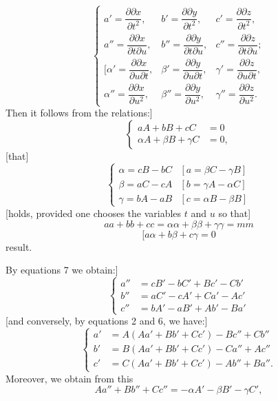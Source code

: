 %
\begin{equation}\tag*{[5]}
\left\{\begin{array}{lll}
a'=\dfrac{\partial\partial x}{\partial t^2},&b'=\dfrac{\partial\partial y}{\partial t^2},&c'=\dfrac{\partial\partial z}{\partial t^2},\\[6pt]
a''=\dfrac{\partial\partial x}{\partial t\partial u},&b''=\dfrac{\partial\partial y}{\partial t\partial u},&c''=\dfrac{\partial\partial z}{\partial t\partial u};\\[6pt]
[\alpha'=\dfrac{\partial\partial x}{\partial u\partial t},&\beta'=\dfrac{\partial\partial y}{\partial u\partial t},&\gamma'=\dfrac{\partial\partial z}{\partial u\partial t},\\[6pt]
\alpha''=\dfrac{\partial\partial x}{\partial u^2},&\beta''=\dfrac{\partial\partial y}{\partial u^2},&\gamma''=\dfrac{\partial\partial z}{\partial u^2}.
\end{array}\right.
\end{equation}
\indent Then it follows from the relations:]
\begin{equation}\tag*{[6]}
\left\{\begin{aligned}aA+bB+cC&=0\\ \alpha A+\beta B+\gamma C&=0,\end{aligned}\right.
\end{equation}
[that]
\begin{equation}\tag*{[7]}
\left\{\begin{array}{ll}
\alpha=cB-bC&[a=\beta C-\gamma B]\\
\beta=aC-cA&[b=\gamma A-\alpha C]\\
\gamma=bA-aB&[c=\alpha B-\beta B]
\end{array}\right.
\end{equation}
[holds, provided one chooses the variables $t$ and $u$ so that]
\begin{equation}\tag*{[8]}aa+bb+cc=\alpha\alpha+\beta\beta+\gamma\gamma=mm\end{equation}
\begin{equation}\tag*{[9]}[a\alpha+b\beta+c\gamma=0\end{equation}
result.

By equations 7 we obtain:]
\begin{equation}\tag*{[10]}
\left\{\begin{aligned}
a''&=cB'-bC'+Bc'-Cb'\\
b''&=aC'-cA'+Ca'-Ac'\\
c''&=bA'-aB'+Ab'-Ba'
\end{aligned}\right.
\end{equation}
[and conversely, by equations 2 and 6, we have:]
\begin{equation}\tag*{[11]}
\left\{\begin{aligned}
a'&=A(Aa'+Bb'+Cc')-Bc''+Cb''\\
b'&=B(Aa'+Bb'+Cc')-Ca''+Ac''\\
c'&=C(Aa'+Bb'+Cc')-Ab''+Ba''.
\end{aligned}\right.
\end{equation}
\indent Moreover, we obtain from this
\[
Aa''+Bb''+Cc''=-\alpha A'-\beta B'-\gamma C',
\]

